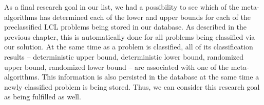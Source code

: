 As a final research goal in our list, we had a possibility
to see which of the meta-algorithms has determined each
of the lower and upper bounds for each of the preclassified
LCL problems being stored in our database. As described in the
previous chapter, this is automatically done for all problems being
classified via our solution. At the same time as a problem is classified,
all of its classification results -- deterministic upper bound,
deterministic lower bound, randomized upper bound, randomized lower bound --
are associated with one of the meta-algorithms. This information is also
persisted in the database at the same time a newly classified problem
is being stored. Thus, we can consider this research goal as being
fulfilled as well.






